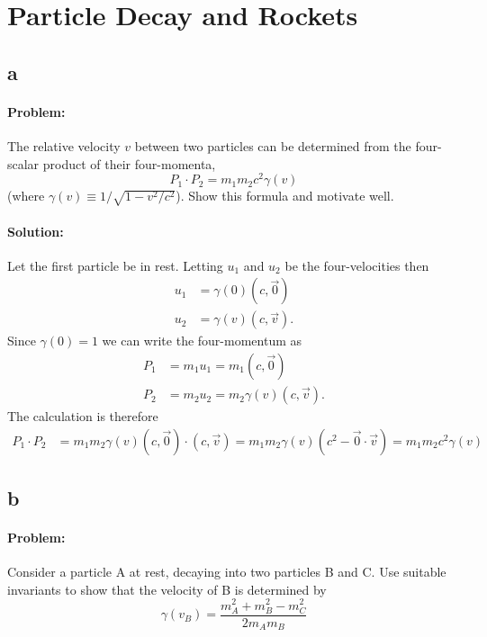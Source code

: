 \section{Particle Decay and Rockets}
\subsection{a}
\paragraph{Problem:} The relative velocity $v$ between two particles can be determined from the four-scalar product of their four-momenta,
\begin{equation*}
    P_1 \cdot P_2 = m_1 m_2 c^2 \gamma(v)
\end{equation*}
(where $\gamma(v) \equiv  1/\sqrt{1 - v^2 / c^2} $). Show this formula and motivate well.

\paragraph{Solution:} Let the first particle be in rest. Letting $u_1$ and $u_2$ be the four-velocities then
\begin{align*}
    u_1 &= \gamma(0) (c, \vec{0})\\
    u_2 &= \gamma(v) (c, \vec{v}).
\end{align*}
Since $\gamma(0) = 1$ we can write the four-momentum as
\begin{align*}
    P_1 &= m_1 u_1 = m_1 (c, \vec{0})\\
    P_2 &= m_2 u_2 = m_2 \gamma(v) (c, \vec{v}).
\end{align*}
The calculation is therefore
\begin{align*}
    P_1 \cdot P_2 &= m_1 m_2 \gamma(v) (c, \vec{0}) \cdot (c, \vec{v}) = m_1 m_2 \gamma(v) (c^2 - \vec{0} \cdot \vec{v}) = m_1 m_2 c^2 \gamma(v)
\end{align*}
\qedsymbol

\subsection{b}
\paragraph{Problem:} Consider a particle A at rest, decaying into two particles B and C. Use suitable invariants to show that the velocity of B is determined by
\begin{equation*}
    \gamma(v_B) = \frac{m^2_A + m^2_B - m^2_C}{2 m_A m_B}
\end{equation*}

